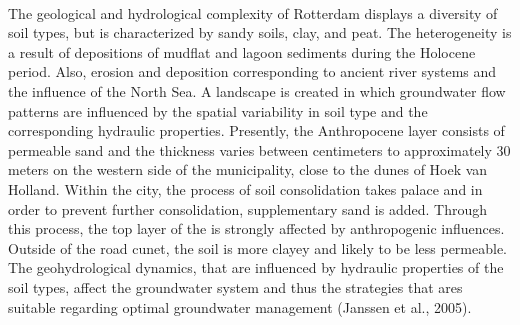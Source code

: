 \\
The geological and hydrological complexity of Rotterdam displays a diversity of soil types, but is characterized by sandy soils, clay, and peat. The heterogeneity is a result of depositions of mudflat and lagoon sediments during the Holocene period. Also, erosion and deposition corresponding to ancient river systems and the influence of the North Sea. A landscape is created in which groundwater flow patterns are influenced by the spatial variability in soil type and the corresponding hydraulic properties. Presently, the Anthropocene layer consists of permeable sand and the thickness varies between centimeters to approximately 30 meters on the western side of the municipality, close to the dunes of Hoek van Holland. Within the city, the process of soil consolidation takes palace and in order to prevent further consolidation, supplementary sand is added. Through this process, the top layer of the is strongly affected by anthropogenic influences.  Outside of the road cunet, the soil is more clayey and likely to be less permeable. The geohydrological dynamics, that are influenced by hydraulic properties of the soil types, affect the groundwater system and thus the strategies that ares suitable regarding optimal groundwater management (Janssen et al., 2005).

